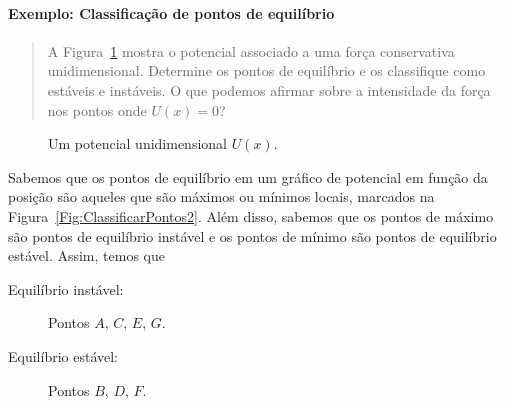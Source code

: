 \paragraph{Exemplo: Classificação de pontos de equilíbrio}

\begin{quote}
A Figura~\ref{Fig:ClassificarPontos} mostra o potencial associado a uma força conservativa unidimensional. Determine os pontos de equilíbrio e os classifique como estáveis e instáveis. O que podemos afirmar sobre a intensidade da força nos pontos onde $U(x) = 0$?
\end{quote}

\begin{figure}[htb]
\centering
{}
\caption{Um potencial unidimensional $U(x)$. \label{Fig:ClassificarPontos}}
\end{figure}

Sabemos que os pontos de equilíbrio em um gráfico de potencial em função da posição são aqueles que são máximos ou mínimos locais, marcados na Figura~\ref{Fig:ClassificarPontos2}. Além disso, sabemos que os pontos de máximo são pontos de equilíbrio instável e os pontos de mínimo são pontos de equilíbrio estável. Assim, temos que
\begin{description}
    \item[Equilíbrio instável:] Pontos $A$, $C$, $E$, $G$.
    \item[Equilíbrio estável:] Pontos $B$, $D$, $F$.
\end{description}

